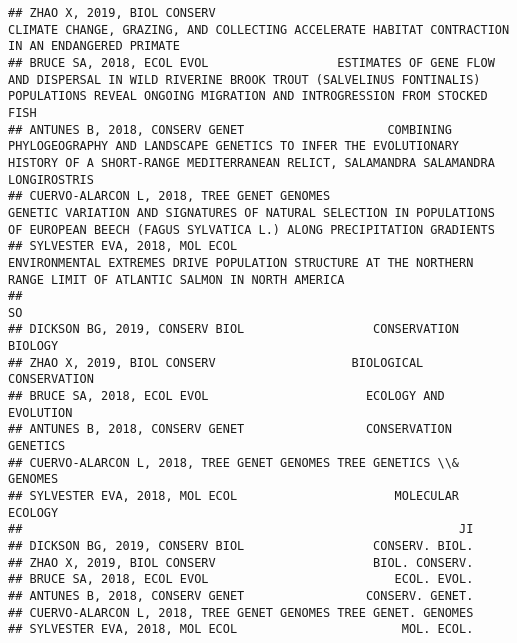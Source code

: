 \documentclass[]{article}
\begin{document}
\begin{verbatim}
## ZHAO X, 2019, BIOL CONSERV                                                                                    CLIMATE CHANGE, GRAZING, AND COLLECTING ACCELERATE HABITAT CONTRACTION IN AN ENDANGERED PRIMATE
## BRUCE SA, 2018, ECOL EVOL                  ESTIMATES OF GENE FLOW AND DISPERSAL IN WILD RIVERINE BROOK TROUT (SALVELINUS FONTINALIS) POPULATIONS REVEAL ONGOING MIGRATION AND INTROGRESSION FROM STOCKED FISH
## ANTUNES B, 2018, CONSERV GENET                    COMBINING PHYLOGEOGRAPHY AND LANDSCAPE GENETICS TO INFER THE EVOLUTIONARY HISTORY OF A SHORT-RANGE MEDITERRANEAN RELICT, SALAMANDRA SALAMANDRA LONGIROSTRIS
## CUERVO-ALARCON L, 2018, TREE GENET GENOMES                          GENETIC VARIATION AND SIGNATURES OF NATURAL SELECTION IN POPULATIONS OF EUROPEAN BEECH (FAGUS SYLVATICA L.) ALONG PRECIPITATION GRADIENTS
## SYLVESTER EVA, 2018, MOL ECOL                                                               ENVIRONMENTAL EXTREMES DRIVE POPULATION STRUCTURE AT THE NORTHERN RANGE LIMIT OF ATLANTIC SALMON IN NORTH AMERICA
##                                                                   SO
## DICKSON BG, 2019, CONSERV BIOL                  CONSERVATION BIOLOGY
## ZHAO X, 2019, BIOL CONSERV                   BIOLOGICAL CONSERVATION
## BRUCE SA, 2018, ECOL EVOL                      ECOLOGY AND EVOLUTION
## ANTUNES B, 2018, CONSERV GENET                 CONSERVATION GENETICS
## CUERVO-ALARCON L, 2018, TREE GENET GENOMES TREE GENETICS \\& GENOMES
## SYLVESTER EVA, 2018, MOL ECOL                      MOLECULAR ECOLOGY
##                                                             JI
## DICKSON BG, 2019, CONSERV BIOL                  CONSERV. BIOL.
## ZHAO X, 2019, BIOL CONSERV                      BIOL. CONSERV.
## BRUCE SA, 2018, ECOL EVOL                          ECOL. EVOL.
## ANTUNES B, 2018, CONSERV GENET                 CONSERV. GENET.
## CUERVO-ALARCON L, 2018, TREE GENET GENOMES TREE GENET. GENOMES
## SYLVESTER EVA, 2018, MOL ECOL                       MOL. ECOL.

\end{verbatim}
\end{document}
